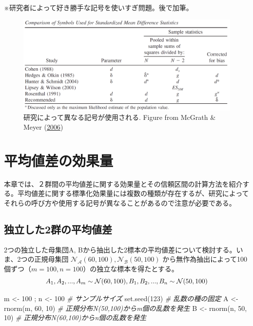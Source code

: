 \documentclass[
  ja=standard, xelatex, base=12pt]{bxjsreport}
\newenvironment{Shaded}{\begin{snugshade}}{\end{snugshade}}
\newcommand{\CommentTok}[1]{\textcolor[rgb]{0.56,0.35,0.01}{\textit{#1}}}
\newcommand{\DecValTok}[1]{\textcolor[rgb]{0.00,0.00,0.81}{#1}}
\newcommand{\FunctionTok}[1]{\textcolor[rgb]{0.00,0.00,0.00}{#1}}
\newcommand{\NormalTok}[1]{#1}
\newcommand{\OtherTok}[1]{\textcolor[rgb]{0.56,0.35,0.01}{#1}}
\begin{document}
※研究者によって好き勝手な記号を使いすぎ問題。後で加筆。

\begin{figure}
\centering
\includegraphics{images/McGrathMeyer2006.png}
\caption{研究によって異なる記号が使用される. Figure from McGrath \& Meyer (\protect\hyperlink{ref-mcgrath2006}{2006})}
\end{figure}

\hypertarget{ux5e73ux5747ux5024ux5deeux306eux52b9ux679cux91cf-1}{%
\chapter{平均値差の効果量}\label{ux5e73ux5747ux5024ux5deeux306eux52b9ux679cux91cf-1}}

本章では、２群間の平均値差に関する効果量とその信頼区間の計算方法を紹介する。平均値差に関する標準化効果量には複数の種類が存在するが、研究によってそれらの呼び方や使用する記号が異なることがあるので注意が必要である。

\hypertarget{ux72ecux7acbux3057ux305f2ux7fa4ux306eux5e73ux5747ux5024ux5dee-1}{%
\section{独立した2群の平均値差}\label{ux72ecux7acbux3057ux305f2ux7fa4ux306eux5e73ux5747ux5024ux5dee-1}}

2つの独立した母集団A, Bから抽出した2標本の平均値差について検討する。いま、2つの正規母集団 \(\mathcal{N_A}(60, 100), \mathcal{N_B}(50, 100)\) から無作為抽出によって100個ずつ（\(m=100, n=100\)）の独立な標本を得たとする。\[
A_1, A_2, ..., A_{m} \sim \mathcal{N}(60, 100),\\
B_1, B_2, ..., B_{n} \sim \mathcal{N}(50, 100)
\]

\begin{Shaded}
\begin{Highlighting}[]
\NormalTok{m }\OtherTok{\textless{}{-}} \DecValTok{100}\NormalTok{ ; n }\OtherTok{\textless{}{-}} \DecValTok{100}   \CommentTok{\# サンプルサイズ}
\FunctionTok{set.seed}\NormalTok{(}\DecValTok{123}\NormalTok{)         }\CommentTok{\# 乱数の種の固定}
\NormalTok{A }\OtherTok{\textless{}{-}} \FunctionTok{rnorm}\NormalTok{(m, }\DecValTok{60}\NormalTok{, }\DecValTok{10}\NormalTok{) }\CommentTok{\# 正規分布N(50,100)からm個の乱数を発生}
\NormalTok{B }\OtherTok{\textless{}{-}} \FunctionTok{rnorm}\NormalTok{(n, }\DecValTok{50}\NormalTok{, }\DecValTok{10}\NormalTok{) }\CommentTok{\# 正規分布N(60,100)からn個の乱数を発生}
\end{Highlighting}
\end{Shaded}
\end{document}
